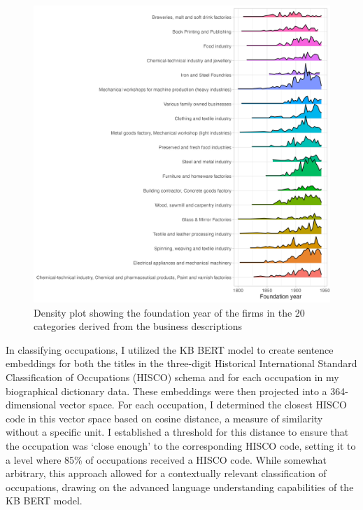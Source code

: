 \documentclass[
]{article}
\begin{document}
\begin{figure}

{\centering \includegraphics[width=5in,height=\textheight]{assets/geom_density_ridges.png}

}

\caption{\label{fig-density-ridges}Density plot showing the foundation
year of the firms in the 20 categories derived from the business
descriptions}

\end{figure}

In classifying occupations, I utilized the KB BERT model to create
sentence embeddings for both the titles in the three-digit Historical
International Standard Classification of Occupations (HISCO) schema and
for each occupation in my biographical dictionary data. These embeddings
were then projected into a 364-dimensional vector space. For each
occupation, I determined the closest HISCO code in this vector space
based on cosine distance, a measure of similarity without a specific
unit. I established a threshold for this distance to ensure that the
occupation was `close enough' to the corresponding HISCO code, setting
it to a level where 85\% of occupations received a HISCO code. While
somewhat arbitrary, this approach allowed for a contextually relevant
classification of occupations, drawing on the advanced language
understanding capabilities of the KB BERT model.
\end{document}
